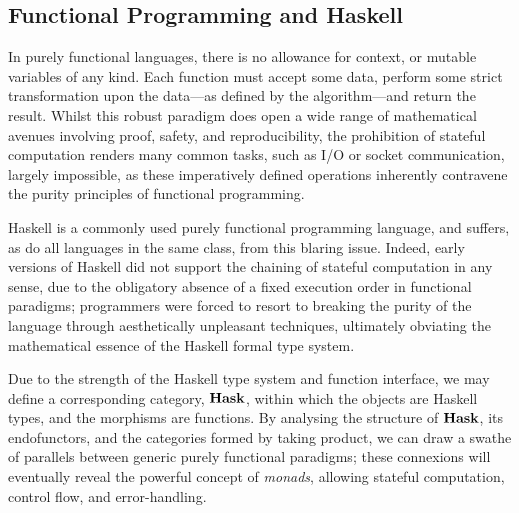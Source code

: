 %
%
\subsection{Functional Programming and Haskell}

In purely functional languages, there is no allowance for context, or mutable
variables of any kind. Each function must accept some data, perform some strict
transformation upon the data---as defined by the algorithm---and return the
result. Whilst this robust paradigm does open a wide range of mathematical
avenues involving proof, safety, and reproducibility, the prohibition of
stateful computation renders many common tasks, such as I/O or socket
communication, largely impossible, as these imperatively defined operations
inherently contravene the purity principles of functional programming.

Haskell is a commonly used purely functional programming language, and suffers,
as do all languages in the same class, from this blaring issue.  Indeed, early
versions of Haskell did not support the chaining of stateful computation in any
sense, due to the obligatory absence of a fixed execution order in functional
paradigms; programmers were forced to resort to breaking the purity of the
language through aesthetically unpleasant techniques, ultimately obviating the
mathematical essence of the Haskell formal type system.

Due to the strength of the Haskell type system and function interface, we may
define a corresponding category, $\operatorname{\mathbf{Hask}}$, within which the objects are
Haskell types, and the morphisms are functions\footnotemark.
%
By analysing the structure of $\operatorname{\mathbf{Hask}}$, its endofunctors, and the categories
formed by taking product, we can draw a swathe of parallels between generic
purely functional paradigms; these connexions will eventually reveal the
powerful concept of \emph{monads}, allowing stateful computation, control flow,
and error-handling.

